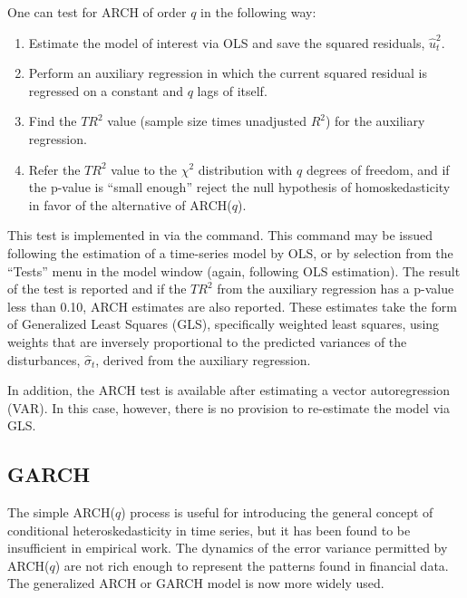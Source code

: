 One can test for ARCH of order $q$ in the following
way:
\begin{enumerate}
\item Estimate the model of interest via OLS and save the squared
  residuals, $\hat{u}^2_t$.
\item Perform an auxiliary regression in which the current squared
  residual is regressed on a constant and $q$ lags of itself.
\item Find the $TR^2$ value (sample size times unadjusted $R^2$) for
  the auxiliary regression.
\item Refer the $TR^2$ value to the $\chi^2$ distribution with $q$
  degrees of freedom, and if the p-value is ``small enough'' reject
  the null hypothesis of homoskedasticity in favor of the alternative
  of ARCH($q$).
\end{enumerate}

This test is implemented in  via the  command.
This command may be issued following the estimation of a time-series
model by OLS, or by selection from the ``Tests'' menu in the model
window (again, following OLS estimation).  The result of the test is
reported and if the $TR^2$ from the auxiliary regression has a p-value
less than 0.10, ARCH estimates are also reported.  These estimates
take the form of Generalized Least Squares (GLS), specifically
weighted least squares, using weights that are inversely proportional
to the predicted variances of the disturbances, $\hat{\sigma}_t$,
derived from the auxiliary regression.

In addition, the ARCH test is available after estimating a vector
autoregression (VAR).  In this case, however, there is no provision to
re-estimate the model via GLS.

\subsection{GARCH}
\label{subsec:garch}

The simple ARCH($q$) process is useful for introducing the general
concept of conditional heteroskedasticity in time series, but it has
been found to be insufficient in empirical work.  The dynamics of the
error variance permitted by ARCH($q$) are not rich enough to represent 
the patterns found in financial data.  The generalized ARCH or GARCH
model is now more widely used.  

